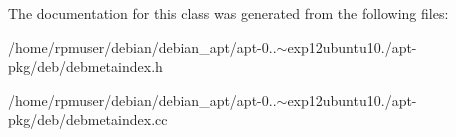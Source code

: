 \-The documentation for this class was generated from the following files\-:\begin{DoxyCompactItemize}
\item 
/home/rpmuser/debian/debian\-\_\-apt/apt-\/0..$\sim$exp12ubuntu10./apt-\/pkg/deb/debmetaindex.\-h\item 
/home/rpmuser/debian/debian\-\_\-apt/apt-\/0..$\sim$exp12ubuntu10./apt-\/pkg/deb/debmetaindex.\-cc\end{DoxyCompactItemize}

